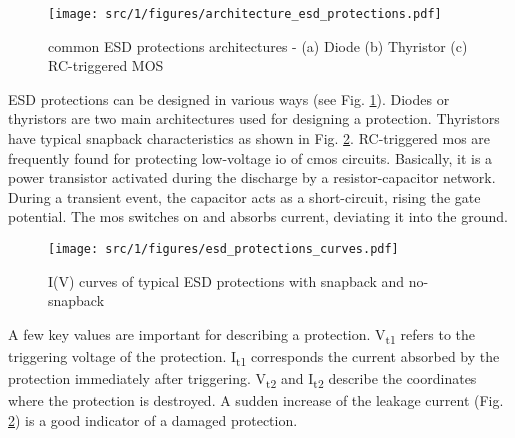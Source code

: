 \begin{figure}[!h]
  \centering
  \texttt{[image: src/1/figures/architecture\_esd\_protections.pdf]}
  \caption{common ESD protections architectures - (a) Diode (b) Thyristor (c) RC-triggered MOS}
  \label{fig:architecture-esd-protection}
\end{figure}

ESD protections can be designed in various ways (see Fig. \ref{fig:architecture-esd-protection}).
Diodes or thyristors are two main architectures used for designing a protection.
Thyristors have typical snapback characteristics as shown in Fig. \ref{fig:iv-curve-esd-protection}.
RC-triggered \gls{mos} are frequently found for protecting low-voltage \gls{io} of \gls{cmos} circuits.
Basically, it is a power transistor activated during the discharge by a resistor-capacitor network.
During a transient event, the capacitor acts as a short-circuit, rising the gate potential.
The \gls{mos} switches on and absorbs current, deviating it into the ground.

\begin{figure}[!h]
  \centering
  \texttt{[image: src/1/figures/esd\_protections\_curves.pdf]}
  \caption{I(V) curves of typical ESD protections with snapback and no-snapback}
  \label{fig:iv-curve-esd-protection}
\end{figure}

A few key values are important for describing a protection.
V\textsubscript{t1} refers to the triggering voltage of the protection.
I\textsubscript{t1} corresponds the current absorbed by the protection immediately after triggering.
V\textsubscript{t2} and I\textsubscript{t2} describe the coordinates where the protection is destroyed.
A sudden increase of the leakage current (Fig. \ref{fig:iv-curve-esd-protection}) is a good indicator of a damaged protection.

